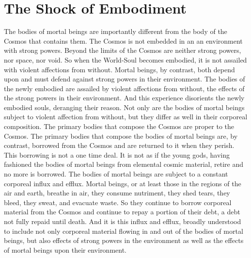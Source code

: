 
\section{The Shock of Embodiment} %
\label{sec:the_shock_of_embodiment}

The bodies of mortal beings are importantly different from the body of the Cosmos that contains them. The Cosmos is not embedded in an an environment with strong powers. Beyond the limits of the Cosmos are neither strong powers, nor space, nor void. So when the World-Soul becomes embodied, it is not assailed with violent affections from without. Mortal beings, by contrast, both depend upon and must defend against strong powers in their environment. The bodies of the newly embodied are assailed by violent affections from without, the effects of the strong powers in their environment. And this experience disorients the newly embodied souls, deranging their reason. Not only are the bodies of mortal beings subject to violent affection from without, but they differ as well in their corporeal composition. The primary bodies that compose the Cosmos are proper to the Cosmos. The primary bodies that compose the bodies of mortal beings are, by contrast, borrowed from the Cosmos and are returned to it when they perish. This borrowing is not a one time deal. It is not as if the young gods, having fashioned the bodies of mortal beings from elemental cosmic material, retire and no more is borrowed. The bodies of mortal beings are subject to a constant corporeal influx and efflux. Mortal beings, or at least those in the regions of the air and earth, breathe in air, they consume nutriment, they shed tears, they bleed, they sweat, and evacuate waste. So they continue to borrow corporeal material from the Cosmos and continue to repay a portion of their debt, a debt not fully repaid until death. And it is this influx and efflux, broadly understood to include not only corporeal material flowing in and out of the bodies of mortal beings, but also effects of strong powers in the environment as well as the effects of mortal beings upon their environment.

